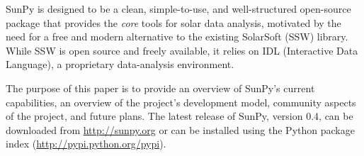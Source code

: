 SunPy is designed to be a clean, simple-to-use, and well-structured open-source package that provides 
the \textit{core} tools for solar data analysis, motivated by the need for a free and 
modern alternative to the existing SolarSoft (SSW) library. While SSW is open source 
and freely available, it relies on IDL (Interactive Data Language), a proprietary 
data-analysis environment.

The purpose of this paper is to provide an overview of SunPy's current
capabilities, an overview of the project's development model, community aspects of the
project, and future plans. The latest release of SunPy, version 0.4,
can be downloaded from \url{http://sunpy.org} or can be
installed using the Python package index (\url{http://pypi.python.org/pypi}).